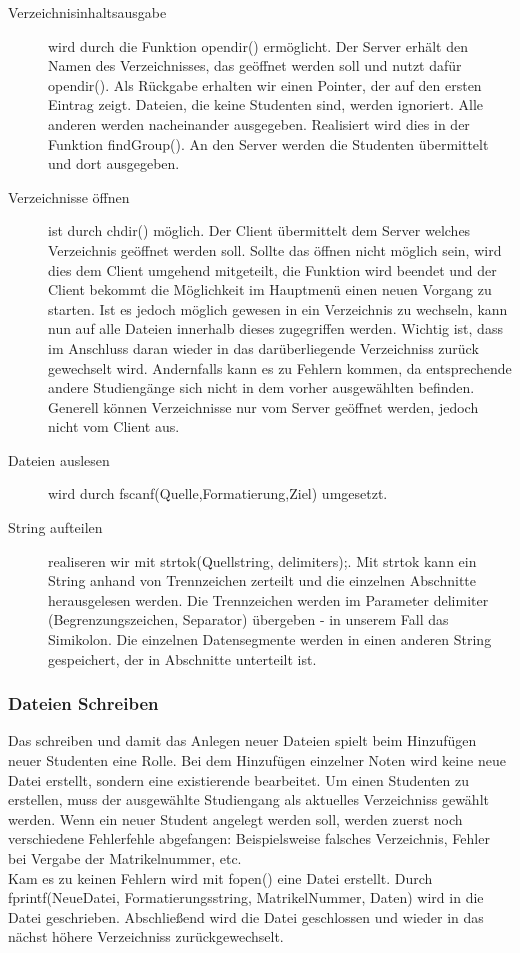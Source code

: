 \documentclass{scrartcl}
\begin{document}
			\begin{description}
				\item[Verzeichnisinhaltsausgabe] wird durch die Funktion opendir() ermöglicht. Der Server erhält den Namen des Verzeichnisses, das geöffnet werden soll und nutzt dafür opendir(). Als Rückgabe erhalten wir einen Pointer, der auf den ersten Eintrag zeigt. Dateien, die keine Studenten sind, werden ignoriert. Alle anderen werden nacheinander ausgegeben. Realisiert wird dies in der Funktion findGroup(). An den Server werden die Studenten übermittelt und dort ausgegeben.
				\item[Verzeichnisse öffnen] ist durch chdir() möglich. Der Client übermittelt dem Server welches Verzeichnis geöffnet werden soll. Sollte das öffnen nicht möglich sein, wird dies dem Client umgehend mitgeteilt, die Funktion wird beendet und der Client bekommt die Möglichkeit im Hauptmenü einen neuen Vorgang zu starten. Ist es jedoch möglich gewesen in ein Verzeichnis zu wechseln, kann nun auf alle Dateien innerhalb dieses zugegriffen werden. Wichtig ist, dass im Anschluss daran wieder in das darüberliegende Verzeichniss zurück gewechselt wird. Andernfalls kann es zu Fehlern kommen, da entsprechende andere Studiengänge sich nicht in dem vorher ausgewählten befinden.\\
				Generell können Verzeichnisse nur vom Server geöffnet werden, jedoch nicht vom Client aus.
				\item[Dateien auslesen] wird durch fscanf(Quelle,Formatierung,Ziel) umgesetzt.
				\item[String aufteilen] realiseren wir mit  strtok(Quellstring, delimiters);. Mit strtok kann ein String anhand von Trennzeichen zerteilt und die einzelnen Abschnitte herausgelesen werden. Die Trennzeichen werden im Parameter delimiter (Begrenzungszeichen, Separator) übergeben - in unserem Fall das Simikolon. Die einzelnen Datensegmente werden in einen anderen String gespeichert, der in Abschnitte unterteilt ist. \\
			\end{description}
		\subsubsection{Dateien Schreiben}	
			Das schreiben und damit das Anlegen neuer Dateien spielt beim Hinzufügen neuer Studenten eine Rolle. Bei dem Hinzufügen einzelner Noten wird keine neue Datei erstellt, sondern eine existierende bearbeitet. Um einen Studenten zu erstellen, muss der ausgewählte Studiengang als aktuelles Verzeichniss gewählt werden. Wenn ein neuer Student angelegt werden soll, werden zuerst noch verschiedene Fehlerfehle abgefangen: Beispielsweise falsches Verzeichnis, Fehler bei Vergabe der Matrikelnummer, etc. \\
			Kam es zu keinen Fehlern wird mit fopen() eine Datei erstellt. Durch fprintf(NeueDatei, Formatierungsstring, MatrikelNummer, Daten) wird in die Datei geschrieben. Abschließend wird die Datei geschlossen und wieder in das nächst höhere Verzeichniss zurückgewechselt.
\end{document}
